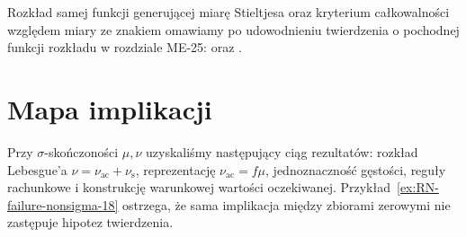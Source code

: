 Rozkład samej funkcji generującej miarę Stieltjesa oraz
kryterium całkowalności względem miary ze znakiem
omawiamy po udowodnieniu twierdzenia o pochodnej
funkcji rozkładu w rozdziale ME-25:
oraz
.


\section{Mapa implikacji}
Przy $\sigma$-skończoności $\mu,\nu$ uzyskaliśmy
następujący ciąg rezultatów: rozkład Lebesgue'a
$\nu=\nu_{\mathrm{ac}}+\nu_{\mathrm{s}}$,
reprezentację $\nu_{\mathrm{ac}}=f\mu$,
jednoznaczność gęstości, reguły rachunkowe i
konstrukcję warunkowej wartości oczekiwanej.
Przykład~\ref{ex:RN-failure-nonsigma-18} ostrzega,
że sama implikacja między zbiorami zerowymi
nie zastępuje hipotez twierdzenia.
